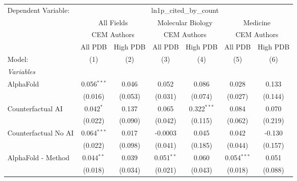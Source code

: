 \begingroup
\centering
\begin{tabular}{lcccccc}
   \tabularnewline \midrule \midrule
   Dependent Variable: & \multicolumn{6}{c}{ln1p\_cited\_by\_count}\\
 & \multicolumn{2}{c}{All Fields} & \multicolumn{2}{c}{Molecular Biology} & \multicolumn{2}{c}{Medicine} \\
\cmidrule(lr){2-3} \cmidrule(lr){4-5} \cmidrule(lr){6-7}
 & \multicolumn{2}{c}{CEM Authors} & \multicolumn{2}{c}{CEM Authors} & \multicolumn{2}{c}{CEM Authors} \\
\cmidrule(lr){2-3} \cmidrule(lr){4-5} \cmidrule(lr){6-7}
 & \multicolumn{1}{c}{All PDB} & \multicolumn{1}{c}{High PDB} & \multicolumn{1}{c}{All PDB} & \multicolumn{1}{c}{High PDB} & \multicolumn{1}{c}{All PDB} & \multicolumn{1}{c}{High PDB} \\
\cmidrule(lr){2-2} \cmidrule(lr){3-3} \cmidrule(lr){4-4} \cmidrule(lr){5-5} \cmidrule(lr){6-6} \cmidrule(lr){7-7}
   Model:                                                     & (1)           & (2)     & (3)          & (4)           & (5)           & (6)\\  
   \midrule
   \emph{Variables}\\
   AlphaFold                                                  & 0.056$^{***}$ & 0.046   & 0.052        & 0.086         & 0.028         & 0.133\\   
                                                              & (0.016)       & (0.053) & (0.031)      & (0.074)       & (0.027)       & (0.144)\\   
   Counterfactual AI                                          & 0.042$^{*}$   & 0.137   & 0.065        & 0.322$^{***}$ & 0.084         & 0.070\\   
                                                              & (0.022)       & (0.090) & (0.042)      & (0.115)       & (0.062)       & (0.219)\\   
   Counterfactual No AI                                       & 0.064$^{***}$ & 0.017   & -0.0003      & 0.045         & 0.042         & -0.130\\   
                                                              & (0.022)       & (0.098) & (0.041)      & (0.185)       & (0.044)       & (0.157)\\   
   AlphaFold - Method                                         & 0.044$^{**}$  & 0.039   & 0.051$^{**}$ & 0.060         & 0.054$^{***}$ & 0.051\\   
                                                              & (0.018)       & (0.034) & (0.021)      & (0.043)       & (0.018)       & (0.088)\\   

\end{tabular}
